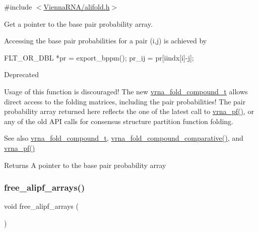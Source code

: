 {\ttfamily \#include $<$\mbox{\hyperlink{alifold_8h}{Vienna\+R\+N\+A/alifold.\+h}}$>$}



Get a pointer to the base pair probability array. 

Accessing the base pair probabilities for a pair (i,j) is achieved by \begin{DoxyVerb}FLT_OR_DBL *pr = export_bppm(); pr_ij = pr[iindx[i]-j]; \end{DoxyVerb}


\begin{DoxyRefDesc}{Deprecated}
\item[\mbox{\hyperlink{deprecated__deprecated000021}{Deprecated}}]Usage of this function is discouraged! The new \mbox{\hyperlink{group__fold__compound_ga1b0cef17fd40466cef5968eaeeff6166}{vrna\+\_\+fold\+\_\+compound\+\_\+t}} allows direct access to the folding matrices, including the pair probabilities! The pair probability array returned here reflects the one of the latest call to \mbox{\hyperlink{group__pf__fold_ga29e256d688ad221b78d37f427e0e99bc}{vrna\+\_\+pf()}}, or any of the old A\+PI calls for consensus structure partition function folding.\end{DoxyRefDesc}


\begin{DoxySeeAlso}{See also}
\mbox{\hyperlink{group__fold__compound_ga1b0cef17fd40466cef5968eaeeff6166}{vrna\+\_\+fold\+\_\+compound\+\_\+t}}, \mbox{\hyperlink{group__fold__compound_gad6bacc816af274922b13d947f708aa0c}{vrna\+\_\+fold\+\_\+compound\+\_\+comparative()}}, and \mbox{\hyperlink{group__pf__fold_ga29e256d688ad221b78d37f427e0e99bc}{vrna\+\_\+pf()}}
\end{DoxySeeAlso}
\begin{DoxyReturn}{Returns}
A pointer to the base pair probability array 
\end{DoxyReturn}
\mbox{\label{group__consensus__pf__fold_ga0c0498f35686e26b38ee460d3db1a661}} 
\subsubsection{\texorpdfstring{free\+\_\+alipf\+\_\+arrays()}{free\_alipf\_arrays()}}
{\footnotesize\ttfamily void free\+\_\+alipf\+\_\+arrays (\begin{DoxyParamCaption}\item[{void}]{ }\end{DoxyParamCaption})}



